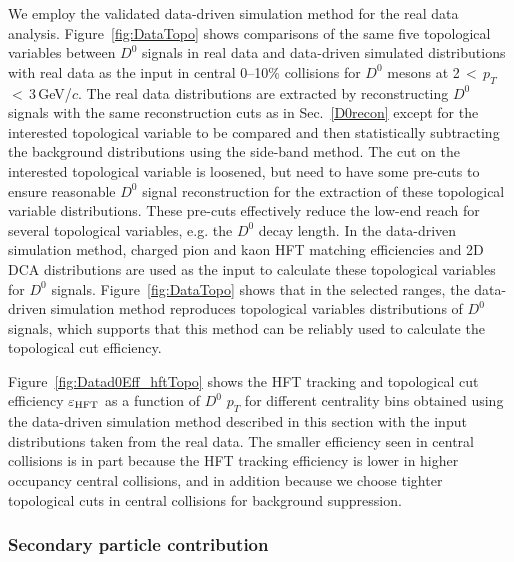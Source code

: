 \documentclass[%
 reprint,	
 amsmath,amssymb,
 aps,
 prc,
]{revtex4-1}
\begin{document}
We employ the validated data-driven simulation method for the real data analysis. Figure~\ref{fig:DataTopo} shows comparisons of the same five topological variables between $D^0$ signals in real data and data-driven simulated distributions with real data as the input in central 0--10\% collisions for $D^0$ mesons at 2\,$<$\,$p_{T}$\,$<$\,3\,GeV/$c$. The real data distributions are extracted by reconstructing $D^0$ signals with the same reconstruction cuts as in Sec.~\ref{D0recon} except for the interested topological variable to be compared and then statistically subtracting the background distributions using the side-band method. The cut on the interested topological variable is loosened, but need to have some pre-cuts to ensure reasonable $D^0$ signal reconstruction for the extraction of these topological variable distributions. These pre-cuts effectively reduce the low-end reach for several topological variables, e.g. the $D^0$ decay length. In the data-driven simulation method, charged pion and kaon HFT matching efficiencies and 2D DCA distributions are used as the input to calculate these topological variables for $D^0$ signals. Figure~\ref{fig:DataTopo} shows that in the selected ranges, the data-driven simulation method reproduces topological variables distributions of $D^0$ signals, which supports that this method can be reliably used to calculate the topological cut efficiency.


Figure~\ref{fig:Datad0Eff_hftTopo} shows the HFT tracking and topological cut efficiency $\varepsilon_{\rm HFT}$ as a function of $D^0$ $p_{T}$ for different centrality bins obtained using the data-driven simulation method described in this section with the input distributions taken from the real data. The smaller efficiency seen in central collisions is in part because the HFT tracking efficiency is lower in higher occupancy central collisions, and in addition because we choose tighter topological cuts in central collisions for background suppression.

\subsubsection{Secondary particle contribution}
\label{correction:hft:secondary}
\end{document}
